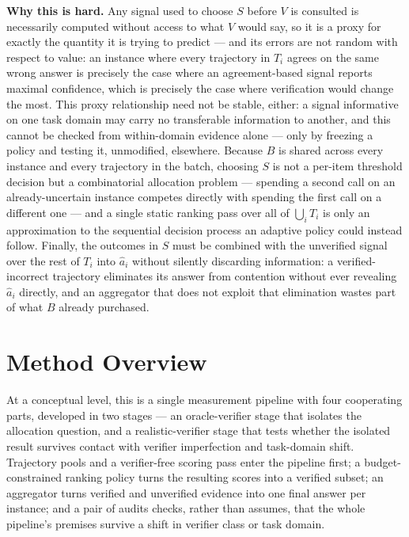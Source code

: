 \documentclass[11pt]{article}
\begin{document}
\noindent\textbf{Why this is hard.} Any signal used to choose $S$ before $V$ is consulted is necessarily computed without access to what $V$ would say, so it is a proxy for exactly the quantity it is trying to predict --- and its errors are not random with respect to value: an instance where every trajectory in $T_i$ agrees on the same wrong answer is precisely the case where an agreement-based signal reports maximal confidence, which is precisely the case where verification would change the most. This proxy relationship need not be stable, either: a signal informative on one task domain may carry no transferable information to another, and this cannot be checked from within-domain evidence alone --- only by freezing a policy and testing it, unmodified, elsewhere. Because $B$ is shared across every instance and every trajectory in the batch, choosing $S$ is not a per-item threshold decision but a combinatorial allocation problem --- spending a second call on an already-uncertain instance competes directly with spending the first call on a different one --- and a single static ranking pass over all of $\bigcup_i T_i$ is only an approximation to the sequential decision process an adaptive policy could instead follow. Finally, the outcomes in $S$ must be combined with the unverified signal over the rest of $T_i$ into $\hat a_i$ without silently discarding information: a verified-incorrect trajectory eliminates its answer from contention without ever revealing $\hat a_i$ directly, and an aggregator that does not exploit that elimination wastes part of what $B$ already purchased.

\section{Method Overview}

At a conceptual level, this is a single measurement pipeline with four cooperating parts, developed in two stages --- an oracle-verifier stage that isolates the allocation question, and a realistic-verifier stage that tests whether the isolated result survives contact with verifier imperfection and task-domain shift. Trajectory pools and a verifier-free scoring pass enter the pipeline first; a budget-constrained ranking policy turns the resulting scores into a verified subset; an aggregator turns verified and unverified evidence into one final answer per instance; and a pair of audits checks, rather than assumes, that the whole pipeline's premises survive a shift in verifier class or task domain.
\end{document}
